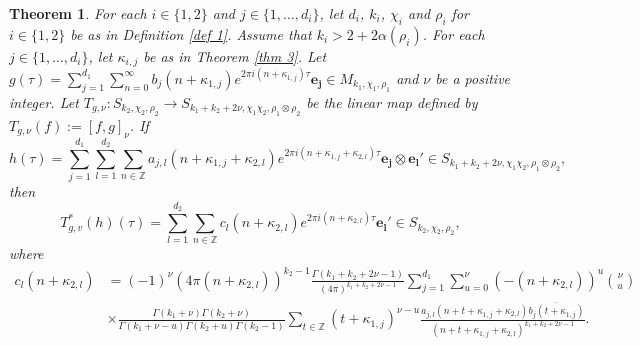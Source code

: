 \documentclass[11pt]{amsart}
\newtheorem{thm}{Theorem}[section]
\theoremstyle{definition}
\theoremstyle{remark}
\numberwithin{equation}{section}
\renewcommand{\(}{\left(}
\renewcommand{\)}{\right)}
\begin{document}
\begin{thm}\label{thm 4}
    For each $i\in \{1,2\}$ and $j\in \{1,\dots,d_i\}$, let $d_i$, $k_i$, $\chi_i$ and $\rho_i$ for $i\in \{1,2\}$ be as in Definition \ref{def 1}.
     Assume that $k_i>2+2\alpha(\rho_i)$.
    For each $j\in \{1,\dots,d_i\}$, let $\kappa_{i,j}$ be as in Theorem \ref{thm 3}.
    Let $g(\tau)=\sum_{j=1}^{d_1}\sum_{n=0}^{\infty} b_j(n+\kappa_{1,j})e^{2\pi i (n+\kappa_{1,j})\tau}\mathbf{e_j}\in M_{k_1,\chi_1,\rho_1}$ and $\nu$ be a positive integer. 
    Let $T_{g,\nu} : S_{k_2,\chi_2,\rho_2}\to S_{k_1+k_2+2\nu,\chi_1\chi_2,\rho_1\otimes \rho_2}$ be the linear map defined by $T_{g,\nu}(f):=[f,g]_{\nu}$. 
    If 
    \[h(\tau)=\sum_{j=1}^{d_1}\sum_{l=1}^{d_2} \sum_{n\in \mathbb{Z}} a_{j,l}(n+\kappa_{1,j}+\kappa_{2,l})e^{2\pi i (n+\kappa_{1,j}+\kappa_{2,l})\tau}\mathbf{e_j}\otimes \mathbf{e_l'}\in S_{k_1+k_2+2\nu,\chi_1\chi_2,\rho_1\otimes\rho_2},\] 
    then 
    \[ T_{g,v}^{*}(h)(\tau)=\sum_{l=1}^{d_2}\sum_{n\in \mathbb{Z}}c_l(n+\kappa_{2,l})e^{2\pi i (n+\kappa_{2,l})\tau}\mathbf{e_l'}\in S_{k_2,\chi_2,\rho_2},\]
    where
    \begin{equation*}
        \begin{aligned}
            c_{l}(n+\kappa_{2,l})&=(-1)^{\nu}(4\pi(n+\kappa_{2,l}))^{k_2-1}\frac{\Gamma(k_1+k_2+2\nu-1)}{(4\pi)^{k_1+k_2+2\nu-1}}\sum_{j=1}^{d_1}\sum_{u=0}^{\nu} (-(n+\kappa_{2,l}))^{u}\binom{\nu}{u}\\
            &\times\frac{\Gamma(k_1+\nu)\Gamma(k_2+\nu)}{\Gamma(k_1+\nu-u)\Gamma(k_2+u)\Gamma(k_2-1)}\sum_{t\in \mathbb{Z}} (t+\kappa_{1,j})^{\nu-u}\frac{a_{j,l}(n+t+\kappa_{1,j}+\kappa_{2,l})\overline{b_j(t+\kappa_{1,j})}}{(n+t+\kappa_{1,j}+\kappa_{2,l})^{k_1+k_2+2\nu-1}}.
        \end{aligned}
    \end{equation*}
\end{thm}
\end{document}
